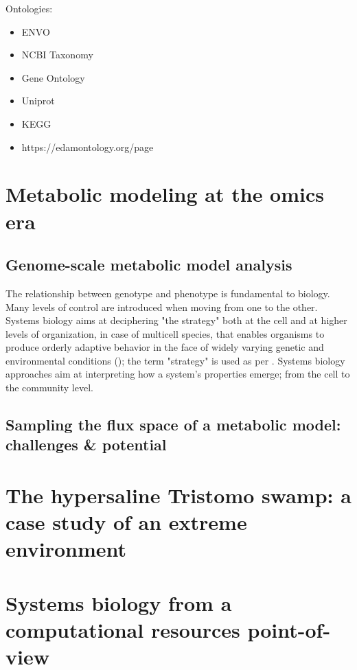    Ontologies: 

   \begin{itemize}
      \item ENVO
      \item NCBI Taxonomy 
      \item Gene Ontology 
      \item Uniprot
      \item KEGG
      \item https://edamontology.org/page
   \end{itemize}



\section{Metabolic modeling at the omics era}


\subsection{Genome-scale metabolic model analysis}

   The relationship between genotype and phenotype is fundamental to biology.
   Many levels of control are introduced when moving from one to the other. 
   Systems biology aims at deciphering "the strategy" both at the cell and at higher levels of organization, in case of multicell species, that enables organisms to produce orderly adaptive behavior in the face of widely varying genetic and environmental conditions (\cite{strohman2002maneuvering}); 
   the term "strategy" is used as per \cite{polanyi1968life}.
   Systems biology approaches aim at interpreting how a system's properties emerge; 
   from the cell to the community level.


\subsection{Sampling the flux space of a metabolic model: challenges \& potential}



\section{The hypersaline Tristomo swamp: a case study of an extreme environment}


\section{Systems biology from a computational resources point-of-view}





